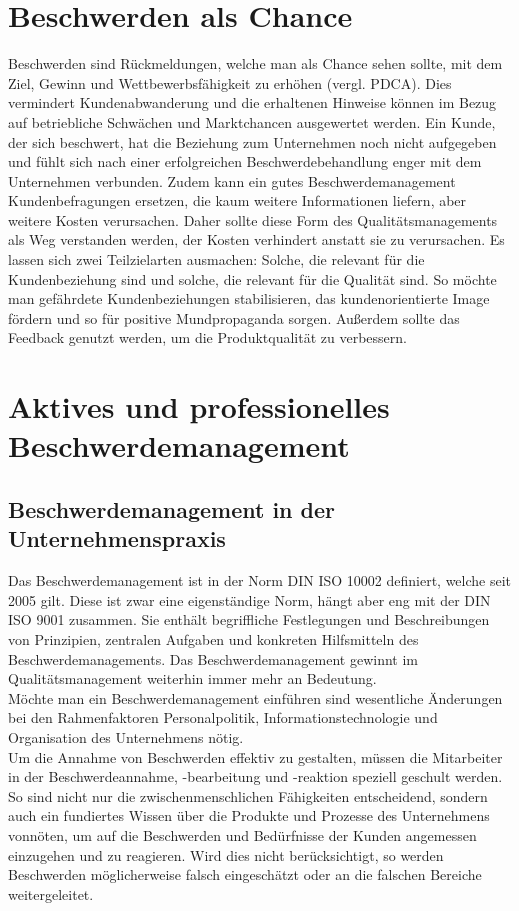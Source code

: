 \documentclass[a4paper,12pt]{article}
\begin{document}
	\section{Beschwerden als Chance}
	Beschwerden sind Rückmeldungen, welche man als Chance sehen sollte, mit dem Ziel, Gewinn und Wettbewerbsfähigkeit zu erhöhen (vergl. PDCA). Dies vermindert Kundenabwanderung und die erhaltenen Hinweise können im Bezug auf betriebliche Schwächen und Marktchancen ausgewertet werden. \cite{Gabler} Ein Kunde, der sich beschwert, hat die Beziehung zum Unternehmen noch nicht aufgegeben und fühlt sich nach einer erfolgreichen Beschwerdebehandlung enger mit dem Unternehmen verbunden. Zudem kann ein gutes Beschwerdemanagement Kundenbefragungen ersetzen, die kaum weitere Informationen liefern, aber weitere Kosten verursachen. Daher sollte diese Form des Qualitätsmanagements als Weg verstanden werden, der Kosten verhindert anstatt sie zu verursachen. Es lassen sich zwei Teilzielarten ausmachen: Solche, die relevant für die Kundenbeziehung sind und solche, die relevant für die Qualität sind.
	So möchte man gefährdete Kundenbeziehungen stabilisieren, das kundenorientierte Image fördern und so für positive Mundpropaganda sorgen. Außerdem sollte das Feedback genutzt werden, um die Produktqualität zu verbessern. \cite{Gabler}
	\newpage
	\section{Aktives und professionelles Beschwerdemanagement}
	\subsection{Beschwerdemanagement in der Unternehmenspraxis}
	Das Beschwerdemanagement ist in der Norm DIN ISO 10002 definiert, welche seit 2005 gilt. Diese ist zwar eine eigenständige Norm, hängt aber eng mit der DIN ISO 9001 zusammen. Sie enthält begriffliche Festlegungen und Beschreibungen von Prinzipien, zentralen Aufgaben und konkreten Hilfsmitteln des Beschwerdemanagements. Das Beschwerdemanagement gewinnt im Qualitätsmanagement weiterhin immer mehr an Bedeutung. \cite{Gabler, stauss2013beschwerdemanagement} \\
	
	\noindent Möchte man ein Beschwerdemanagement einführen sind wesentliche Änderungen bei den Rahmenfaktoren Personalpolitik, Informationstechnologie und Organisation des Unternehmens nötig.\\
	
	\noindent Um die Annahme von Beschwerden effektiv zu gestalten, müssen die Mitarbeiter in der Beschwerdeannahme, -bearbeitung und -reaktion speziell geschult werden. So sind nicht nur die zwischenmenschlichen Fähigkeiten entscheidend, sondern auch ein fundiertes Wissen über die Produkte und Prozesse des Unternehmens vonnöten, um auf die Beschwerden und Bedürfnisse der Kunden angemessen einzugehen und zu reagieren. Wird dies nicht berücksichtigt, so werden Beschwerden möglicherweise falsch eingeschätzt oder an die falschen Bereiche weitergeleitet.\\
	
\end{document}
